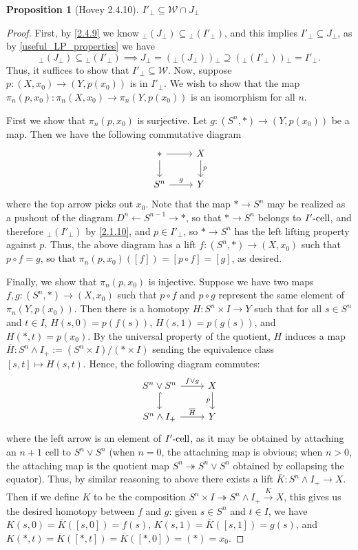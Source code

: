 \documentclass{amsart}
\newcommand{\ol}{\overline}
\theoremstyle{plain}
\newtheorem{proposition}[theorem]{Proposition}
\theoremstyle{definition}
\newcommand{\sseq}{\subseteq}
\newcommand{\spseq}{\supseteq}
\newcommand{\0}{\mathbf{0}}
\newcommand{\p}{{_\perp}}
\newcommand{\onto}{\twoheadrightarrow}
\newcommand{\cW}{\mathcal W}
\renewcommand{\ol}{\overline}
\renewcommand{\(}{\left(}
\renewcommand{\)}{\right)}
\newcommand{\cell}{\text-\mathrm{cell}}
\begin{document}
\begin{proposition}[Hovey 2.4.10]\label{2.4.10}
  $I'\p\sseq\cW\cap J\p$
\end{proposition}
\begin{proof}
  First, by \autoref{2.4.9} we know $\p(J\p)\sseq\p(I'\p)$, and this implies $I'\p\sseq J\p$, as by \autoref{useful_LP_properties} we have
  \[\p(J\p)\sseq\p(I'\p)\implies J\p=(\p(J\p))\p\spseq(\p(I'\p))\p=I'\p.\]
  Thus, it suffices to show that $I'\p\sseq\cW$. Now, suppose $p:(X,x_0)\to (Y,p(x_0))$ is in $I'\p$. We wish to show that the map $\pi_n(p,x_0):\pi_n(X,x_0)\to\pi_n(Y,p(x_0))$ is an isomorphism for all $n$.
  
  First we show that $\pi_n(p,x_0)$ is surjective. Let $g:(S^n,\ast)\to(Y,p(x_0))$ be a map. Then we have the following commutative diagram
  \[\begin{tikzcd}
    \ast & X \\
    {S^n} & Y
    \arrow[from=1-1, to=2-1]
    \arrow["g", from=2-1, to=2-2]
    \arrow[from=1-1, to=1-2]
    \arrow["p", from=1-2, to=2-2]
  \end{tikzcd}\]
  where the top arrow picks out $x_0$. Note that the map $\ast\to S^n$ may be realized as a pushout of the diagram $D^n\leftarrow S^{n-1}\rightarrow\ast$, so that $\ast\to S^n$ belongs to $I'\cell$, and therefore $\p(I'\p)$ by \autoref{2.1.10}, and $p\in I'\p$, so $\ast\to S^n$ has the left lifting property against $p$. Thus, the above diagram has a lift $f:(S^n,\ast)\to (X,x_0)$ such that $p\circ f=g$, so that $\pi_n(p,x_0)([f])=[p\circ f]=[g]$, as desired.

  Finally, we show that $\pi_n(p,x_0)$ is injective. Suppose we have two maps $f,g:(S^n,\ast)\to(X,x_0)$ such that $p\circ f$ and $p\circ g$ represent the same element of $\pi_n(Y,p(x_0))$. Then there is a homotopy $H:S^n\times I\to Y$ such that for all $s\in S^n$ and $t\in I$, $H(s,0)=p(f(s))$, $H(s,1)=p(g(s))$, and $H(\ast,t)=p(x_0)$. By the universal property of the quotient, $H$ induces a map $\ol H:S^n\wedge I_+:=(S^n\times I)/(\ast\times I)$ sending the equivalence class $[s,t]\mapsto H(s,t)$. Hence, the following diagram commutes:
  \[\begin{tikzcd}
    {S^n\vee S^n} & X \\
    {S^n\wedge I_+} & Y
    \arrow[hook, from=1-1, to=2-1]
    \arrow["{\ol H}", from=2-1, to=2-2]
    \arrow["{f\vee g}", from=1-1, to=1-2]
    \arrow["p"', from=1-2, to=2-2]
  \end{tikzcd}\]
  where the left arrow is an element of $I'\cell$, as it may be obtained by attaching an $n+1$ cell to $S^n\vee S^n$ (when $n=0$, the attachning map is obvious; when $n>0$, the attaching map is the quotient map $S^n\onto S^n\vee S^n$ obtained by collapsing the equator). Thus, by similar reasoning to above there exists a lift $\ol K: S^n\wedge I_+\to X$. Then if we define $K$ to be the composition $S^n\times I\onto S^n\wedge I_+\xrightarrow{\ol K} X$, this gives us the desired homotopy between $f$ and $g$: given $s\in S^n$ and $t\in I$, we have $K(s,0)=\ol K([s,0])=f(s)$, $K(s,1)=\ol K([s,1])=g(s)$, and $K(\ast,t)=\ol K([\ast,t])=\ol K([\ast,0])=(\ast)=x_0$.
\end{proof}
\end{document}
